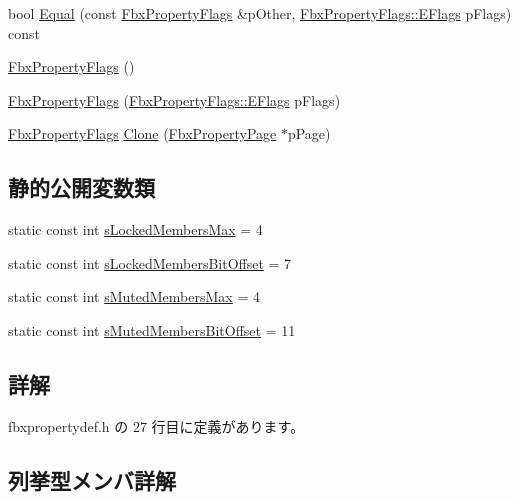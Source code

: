 \begin{DoxyCompactItemize}
\item 
bool \hyperlink{class_fbx_property_flags_a31bd65991f9d38027df4351e7c668a15}{Equal} (const \hyperlink{class_fbx_property_flags}{Fbx\+Property\+Flags} \&p\+Other, \hyperlink{class_fbx_property_flags_afabfa7e0949aac8a7dcdf8a141867e99}{Fbx\+Property\+Flags\+::\+E\+Flags} p\+Flags) const
\item 
\hyperlink{class_fbx_property_flags_a1dcc3803057520825d4632ba07b80974}{Fbx\+Property\+Flags} ()
\item 
\hyperlink{class_fbx_property_flags_a02b8c774de77a0cbd3482f11367c2f0c}{Fbx\+Property\+Flags} (\hyperlink{class_fbx_property_flags_afabfa7e0949aac8a7dcdf8a141867e99}{Fbx\+Property\+Flags\+::\+E\+Flags} p\+Flags)
\item 
\hyperlink{class_fbx_property_flags}{Fbx\+Property\+Flags} \hyperlink{class_fbx_property_flags_ac928577504324520a056da2f3cf7d340}{Clone} (\hyperlink{class_fbx_property_page}{Fbx\+Property\+Page} $\ast$p\+Page)
\end{DoxyCompactItemize}
\subsection*{静的公開変数類}
\begin{DoxyCompactItemize}
\item 
static const int \hyperlink{class_fbx_property_flags_ab5f1aacb767157209cd1b474b0db9c13}{s\+Locked\+Members\+Max} = 4
\item 
static const int \hyperlink{class_fbx_property_flags_a8c37f070e9e4a70a39fc721f69b6424d}{s\+Locked\+Members\+Bit\+Offset} = 7
\item 
static const int \hyperlink{class_fbx_property_flags_a044e37bb3031aa737cf6141d108c77cb}{s\+Muted\+Members\+Max} = 4
\item 
static const int \hyperlink{class_fbx_property_flags_a65028b3fb67cf0516952c23c659b8903}{s\+Muted\+Members\+Bit\+Offset} = 11
\end{DoxyCompactItemize}


\subsection{詳解}


 fbxpropertydef.\+h の 27 行目に定義があります。



\subsection{列挙型メンバ詳解}
\mbox{\label{class_fbx_property_flags_afabfa7e0949aac8a7dcdf8a141867e99}} 
